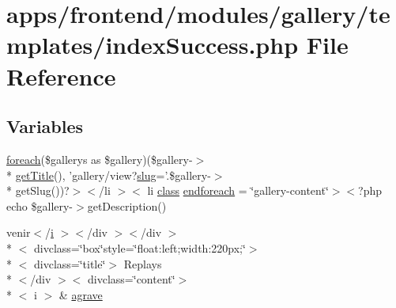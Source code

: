 \hypertarget{frontend_2modules_2gallery_2templates_2index_success_8php}{\section{apps/frontend/modules/gallery/templates/index\-Success.php File Reference}
\label{frontend_2modules_2gallery_2templates_2index_success_8php}
}
\subsection*{Variables}
\begin{DoxyCompactItemize}
\item 
\hyperlink{presse_2modules_2news_2templates_2index_success_8php_abc56db52b2e9a59bcd5c9e45ac5cb332}{foreach}(\$gallerys as \$gallery)(\$gallery-\/$>$\\*
\hyperlink{backend_2modules_2block_2templates_2index_success_8php_a58abfb4a1e6c312e255e475413e1d76d}{get\-Title}(), 'gallery/view?\hyperlink{backend_2modules_2ipn_2templates_2view_success_8php_a2b7d6694be020169de3a660b1b93a40d}{slug}='.\$gallery-\/$>$\\*
get\-Slug())?$>$$<$/li $>$$<$ li \hyperlink{live_2modules_2news_2templates_2__actualitelight_8php_a185c73c6507391d1eb38c776b68ce96d}{class} \hyperlink{frontend_2modules_2gallery_2templates_2index_success_8php_a1564a48b746a96e888ba07e118a7002c}{endforeach} = \char`\"{}gallery-\/content\char`\"{}$>$$<$?php echo \$gallery-\/$>$get\-Description()
\item 
venir$<$/\hyperlink{live_2modules_2partner_2templates_2__rolling_8php_a7e98b8a17c0aad30ba64d47b74e2a6c1}{i} $>$$<$/div $>$$<$/div $>$\\*
$<$ divclass=\char`\"{}box\char`\"{}style=\char`\"{}float\-:left;width\-:220px;\char`\"{}$>$\\*
$<$ divclass=\char`\"{}title\char`\"{}$>$ Replays\\*
$<$/div $>$$<$ divclass=\char`\"{}content\char`\"{}$>$\\*
$<$ i $>$ \& \hyperlink{frontend_2modules_2gallery_2templates_2index_success_8php_a184a65fae2dd681d3cfaff490e159465}{agrave}
\end{DoxyCompactItemize}


